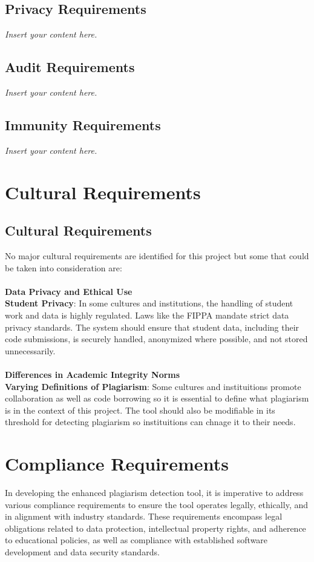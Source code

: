 \documentclass[12pt]{article}
\newcommand{\lips}{\textit{Insert your content here.}}
\begin{document}
\subsection{Privacy Requirements}
\lips
\subsection{Audit Requirements}
\lips
\subsection{Immunity Requirements}
\lips

\section{Cultural Requirements}
\subsection{Cultural Requirements}
No major cultural requirements are identified for this project but some that could be taken into consideration are:\\ \\ 
\noindent \textbf{Data Privacy and Ethical Use}\\ 
\textbf{Student Privacy}: In some cultures and institutions, the handling of student work and data is highly regulated. Laws like the FIPPA mandate strict data privacy standards. The system should ensure that student data, including their code submissions, is securely handled, anonymized where possible, and not stored unnecessarily.
\\ \\
\noindent \textbf{Differences in Academic Integrity Norms}\\ 
\textbf{Varying Definitions of Plagiarism}: Some cultures and instituitions promote collaboration as well as code borrowing so it is essential to define what plagiarism is in the context of this project. The tool should also be modifiable in its threshold for detecting plagiarism so instituitions can chnage it to their needs.


\section{Compliance Requirements}

In developing the enhanced plagiarism detection tool, it is imperative to address
various compliance requirements to ensure the tool operates legally, ethically,
and in alignment with industry standards. These requirements encompass legal
obligations related to data protection, intellectual property rights, and
adherence to educational policies, as well as compliance with established software
development and data security standards.
\end{document}
